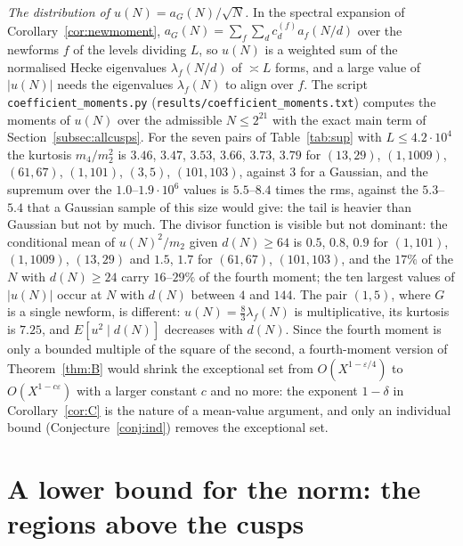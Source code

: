﻿\documentclass[11pt]{amsart}
\theoremstyle{remark}
\newcommand{\e}{\varepsilon}
\begin{document}
\emph{The distribution of $u(N)=a_G(N)/\sqrt N$.} In the spectral expansion of Corollary~\ref{cor:newmoment}, $a_G(N)=\sum_f\sum_{d}c^{(f)}_da_f(N/d)$ over the newforms $f$ of the levels dividing $L$, so $u(N)$ is a weighted sum of the normalised Hecke eigenvalues $\lambda_f(N/d)$ of $\asymp L$ forms, and a large value of $|u(N)|$ needs the eigenvalues $\lambda_f(N)$ to align over $f$. The script \texttt{coefficient\_moments.py} (\texttt{results/coefficient\_moments.txt}) computes the moments of $u(N)$ over the admissible $N\le2^{21}$ with the exact main term of Section~\ref{subsec:allcusps}. For the seven pairs of Table~\ref{tab:sup} with $L\le4.2\cdot10^4$ the kurtosis $m_4/m_2^2$ is $3.46$, $3.47$, $3.53$, $3.66$, $3.73$, $3.79$ for $(13,29)$, $(1,1009)$, $(61,67)$, $(1,101)$, $(3,5)$, $(101,103)$, against $3$ for a Gaussian, and the supremum over the $1.0$--$1.9\cdot10^6$ values is $5.5$--$8.4$ times the rms, against the $5.3$--$5.4$ that a Gaussian sample of this size would give: the tail is heavier than Gaussian but not by much. The divisor function is visible but not dominant: the conditional mean of $u(N)^2/m_2$ given $d(N)\ge64$ is $0.5$, $0.8$, $0.9$ for $(1,101)$, $(1,1009)$, $(13,29)$ and $1.5$, $1.7$ for $(61,67)$, $(101,103)$, and the $17\%$ of the $N$ with $d(N)\ge24$ carry $16$--$29\%$ of the fourth moment; the ten largest values of $|u(N)|$ occur at $N$ with $d(N)$ between $4$ and $144$. The pair $(1,5)$, where $G$ is a single newform, is different: $u(N)=\frac83\lambda_f(N)$ is multiplicative, its kurtosis is $7.25$, and $E[u^2\mid d(N)]$ decreases with $d(N)$. Since the fourth moment is only a bounded multiple of the square of the second, a fourth-moment version of Theorem~\ref{thm:B} would shrink the exceptional set from $O(X^{1-\e/4})$ to $O(X^{1-c\e})$ with a larger constant $c$ and no more: the exponent $1-\delta$ in Corollary~\ref{cor:C} is the nature of a mean-value argument, and only an individual bound (Conjecture~\ref{conj:ind}) removes the exceptional set.

\section{A lower bound for the norm: the regions above the cusps}\label{sec:lower}
\end{document}
